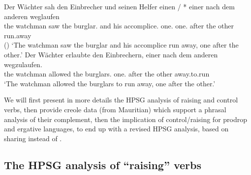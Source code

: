 \eal
\label{german2}
\ex 
\gll Der Wächter  sah den Einbrecher     und seinen Helfer            einen       / *  einer nach dem anderen weglaufen\\
     the watchman saw the burglar.\ACC{} and his    accomplice.\ACC{} one.\ACC{} {} {} one.\NOM{} after the other run.away\\\hfill()
\glt `The watchman saw the burglar and his accomplice run away, one after the other.'
\ex
\gll Der Wächter erlaubte den Einbrechern, einer nach dem anderen wegzulaufen.\\
     the watchman  allowed the burglars.\DAT{} one.\NOM{} after the other away.to.run\\
\glt `The watchman allowed the burglars to run away, one after the other.'
\zl

We will first present in more details the HPSG analysis of raising and
control verbs, then provide creole data (from Mauritian) which support a phrasal analysis of their
complement, then the implication of control/raising for prodrop and ergative languages, to end up
with a revised HPSG analysis, based on sharing \xarg instead of \subj. 

\subsection{The HPSG analysis of ``raising'' verbs}
\label{control:sec-HPSG-anaylsis-of-raising}

